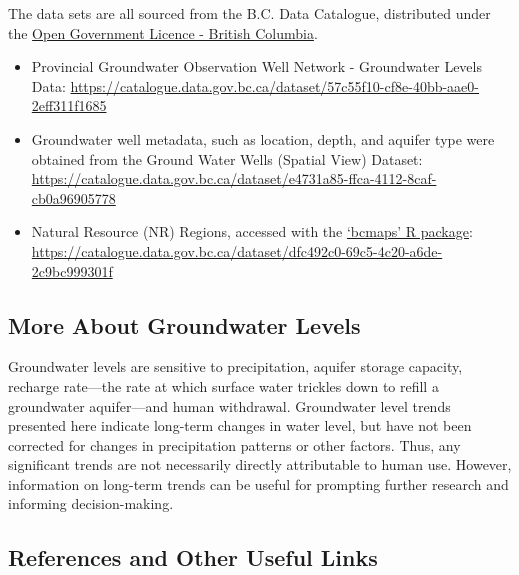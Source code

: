\documentclass[
]{article}
\providecommand{\tightlist}{%
  \setlength{\itemsep}{0pt}\setlength{\parskip}{0pt}}
\begin{document}
The data sets are all sourced from the B.C. Data Catalogue, distributed
under the
\href{https://www2.gov.bc.ca/gov/content?id=A519A56BC2BF44E4A008B33FCF527F61}{Open
Government Licence - British Columbia}.

\begin{itemize}
\tightlist
\item
  Provincial Groundwater Observation Well Network - Groundwater Levels
  Data:
  \url{https://catalogue.data.gov.bc.ca/dataset/57c55f10-cf8e-40bb-aae0-2eff311f1685}
\item
  Groundwater well metadata, such as location, depth, and aquifer type
  were obtained from the Ground Water Wells (Spatial View) Dataset:
  \url{https://catalogue.data.gov.bc.ca/dataset/e4731a85-ffca-4112-8caf-cb0a96905778}
\item
  Natural Resource (NR) Regions, accessed with the
  \href{https://cran.r-project.org/web/packages/bcmaps/index.html}{`bcmaps'
  R package}:
  \url{https://catalogue.data.gov.bc.ca/dataset/dfc492c0-69c5-4c20-a6de-2c9bc999301f}
\end{itemize}

\hypertarget{more-about-groundwater-levels}{%
\subsection{More About Groundwater
Levels}\label{more-about-groundwater-levels}}

Groundwater levels are sensitive to precipitation, aquifer storage
capacity, recharge rate---the rate at which surface water trickles down
to refill a groundwater aquifer---and human withdrawal. Groundwater
level trends presented here indicate long-term changes in water level,
but have not been corrected for changes in precipitation patterns or
other factors. Thus, any significant trends are not necessarily directly
attributable to human use. However, information on long-term trends can
be useful for prompting further research and informing decision-making.

\hypertarget{references-and-other-useful-links}{%
\subsection{References and Other Useful
Links}\label{references-and-other-useful-links}}
\end{document}
